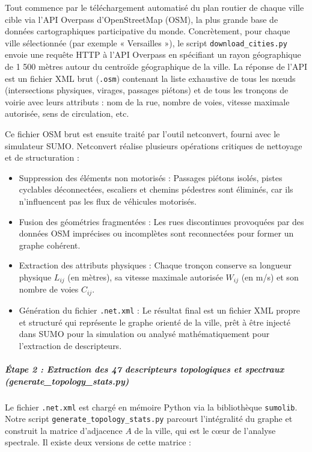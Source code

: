 \documentclass[10pt, a4paper]{article}
\providecommand{\tightlist}{}
\begin{document}
Tout commence par le téléchargement automatisé du plan routier de chaque
ville cible via l'API Overpass d'OpenStreetMap (OSM), la plus grande
base de données cartographiques participative du monde. Concrètement,
pour chaque ville sélectionnée (par exemple « Versailles »), le script
\texttt{download\_cities.py} envoie une requête HTTP à l'API Overpass en
spécifiant un rayon géographique de 1 500 mètres autour du centroïde
géographique de la ville. La réponse de l'API est un fichier XML brut
(\texttt{.osm}) contenant la liste exhaustive de tous les nœuds
(intersections physiques, virages, passages piétons) et de tous les
tronçons de voirie avec leurs attributs : nom de la rue, nombre de
voies, vitesse maximale autorisée, sens de circulation, etc.

Ce fichier OSM brut est ensuite traité par l'outil netconvert, fourni
avec le simulateur SUMO. Netconvert réalise plusieurs opérations
critiques de nettoyage et de structuration :

\begin{itemize}
\tightlist
\item
  Suppression des éléments non motorisés : Passages piétons isolés,
  pistes cyclables déconnectées, escaliers et chemins pédestres sont
  éliminés, car ils n'influencent pas les flux de véhicules motorisés.
\item
  Fusion des géométries fragmentées : Les rues discontinues provoquées
  par des données OSM imprécises ou incomplètes sont reconnectées pour
  former un graphe cohérent.
\item
  Extraction des attributs physiques : Chaque tronçon conserve sa
  longueur physique \(L_{ij}\) (en mètres), sa vitesse maximale
  autorisée \(W_{ij}\) (en m/s) et son nombre de voies \(C_{ij}\).
\item
  Génération du fichier \texttt{.net.xml} : Le résultat final est un
  fichier XML propre et structuré qui représente le graphe orienté de la
  ville, prêt à être injecté dans SUMO pour la simulation ou analysé
  mathématiquement pour l'extraction de descripteurs.
\end{itemize}

\subparagraph{Étape 2 : Extraction des 47 descripteurs topologiques et
spectraux
(generate\_topology\_stats.py)}\label{uxe9tape-2-extraction-des-47-descripteurs-topologiques-et-spectraux-generate_topology_stats.py}

Le fichier \texttt{.net.xml} est chargé en mémoire Python via la
bibliothèque \texttt{sumolib}. Notre script
\texttt{generate\_topology\_stats.py} parcourt l'intégralité du graphe
et construit la matrice d'adjacence \(A\) de la ville, qui est le cœur
de l'analyse spectrale. Il existe deux versions de cette matrice :
\end{document}
